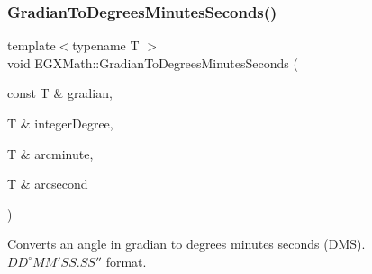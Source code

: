 \subsubsection{\texorpdfstring{Gradian\+To\+Degrees\+Minutes\+Seconds()}{GradianToDegreesMinutesSeconds()}}
{\footnotesize\ttfamily template$<$typename T $>$ \\
void E\+G\+X\+Math\+::\+Gradian\+To\+Degrees\+Minutes\+Seconds (\begin{DoxyParamCaption}\item[{const T \&}]{gradian,  }\item[{T \&}]{integer\+Degree,  }\item[{T \&}]{arcminute,  }\item[{T \&}]{arcsecond }\end{DoxyParamCaption})}



Converts an angle in gradian to degrees minutes seconds (D\+MS). ${DD}^{\circ}{MM}'{SS.SS}''$ format. 


